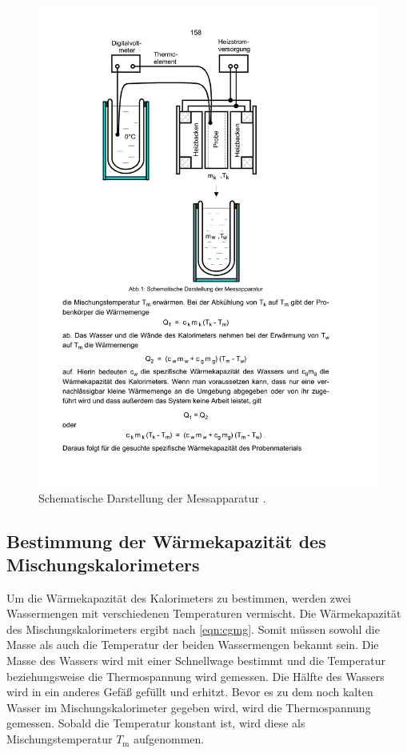 \begin{figure}
  \centering
  \includegraphics[scale=0.6]{content/aufbau.pdf}
\caption{Schematische Darstellung der Messapparatur \cite{anleitung201}.}
  \label{fig:aufbau}
\end{figure}

\subsection{Bestimmung der Wärmekapazität des Mischungskalorimeters}
 Um die Wärmekapazität des Kalorimeters zu bestimmen, werden zwei Wassermengen mit verschiedenen Temperaturen vermischt.   Die Wärmekapazität des Mischungskalorimeters ergibt nach \ref{eqn:cgmg}. Somit müssen sowohl die Masse als auch die Temperatur der beiden Wassermengen bekannt sein. Die Masse des Wassers wird mit einer Schnellwage bestimmt und die Temperatur beziehungsweise die Thermospannung wird gemessen. Die Hälfte des Wassers wird in ein anderes Gefäß gefüllt und erhitzt. Bevor es zu dem noch kalten Wasser im Mischungskalorimeter gegeben wird, wird die Thermospannung gemessen. Sobald die Temperatur konstant ist, wird diese als Mischungstemperatur $T_\mathrm{m}$ aufgenommen.

